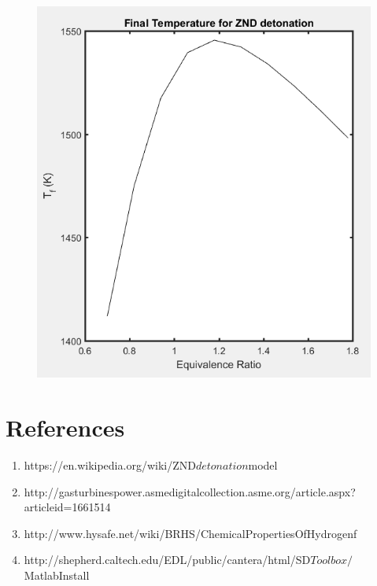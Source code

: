 \documentclass[11pt]{article}
\begin{document}
\begin{figure} [H]
	\begin{center}
\includegraphics[height=0.5\textwidth]{P4}
    \end{center}
\end{figure}




\section{References}
\begin{enumerate}
	\item{https://en.wikipedia.org/wiki/ZND$detonation$model}
    \item{http://gasturbinespower.asmedigitalcollection.asme.org/article.aspx?articleid=1661514}
    \item{http://www.hysafe.net/wiki/BRHS/ChemicalPropertiesOfHydrogenf}
     \item{http://shepherd.caltech.edu/EDL/public/cantera/html/SD$Toolbox/$MatlabInstall}
\end{enumerate}
\end{document}
